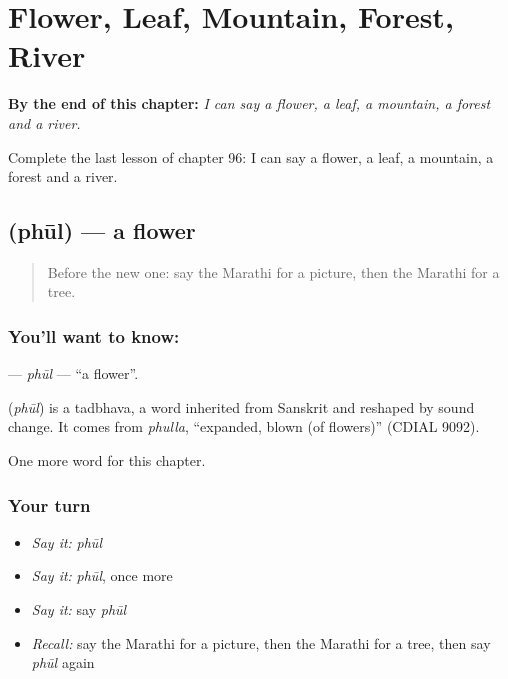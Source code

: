 
\chapter{Flower, Leaf, Mountain, Forest, River}
\label{ch:mr-flower-leaf-mountain-forest-river}

\begin{chapteropening}
\textbf{By the end of this chapter:} \emph{I can say a flower, a leaf, a mountain, a forest and a river.}

Complete the last lesson of chapter 96: I can say a flower, a leaf, a mountain, a forest and a river.
\end{chapteropening}

\section[\texorpdfstring{\mr{फूल} (phūl)}{फूल (phūl)}]{ (phūl) — a flower}

\label{lesson:MR-C96-phul}



\begin{quote}
Before the new one: say the Marathi for a picture, then the Marathi for a tree.
\end{quote}

\subsection*{You'll want to know: }
\textbf{} — \emph{phūl} — \textquotedblleft{}a flower\textquotedblright{}.

\begin{cousinweb}
\textbf{} (\emph{phūl}) is a tadbhava, a word inherited from Sanskrit and reshaped by sound change. It comes from \emph{phulla}, \textquotedblleft{}expanded, blown (of flowers)\textquotedblright{} (CDIAL 9092).
\end{cousinweb}

\begin{grammarlens}[title={What you've built}]
One more word for this chapter.
\end{grammarlens}

\subsection*{Your turn}
\begin{itemize}
\raggedright
  \item \emph{Say it:} \emph{phūl}
  \item \emph{Say it:} \emph{phūl}, once more
  \item \emph{Say it:} say \emph{phūl}
  \item \emph{Recall:} say the Marathi for a picture, then the Marathi for a tree, then say \emph{phūl} again
\end{itemize}

